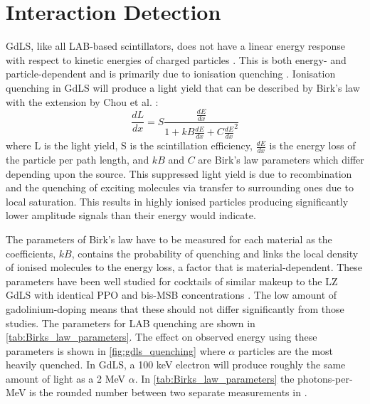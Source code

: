 \section{Interaction Detection}
\label{sec:od_physics}
\par
GdLS, like all LAB-based scintillators, does not have a linear energy response with respect to kinetic energies of charged particles \cite{nonlinear_gdls_ref}.
This is both energy- and particle-dependent and is primarily due to ionisation quenching \cite{lab_quenching_theory_ref}.
Ionisation quenching in GdLS will produce a light yield that can be described by Birk's law \cite{birks_law_ref} with the extension by Chou et al. \cite{generalised_birks_ref}:
\begin{equation} 
    \frac{dL}{dx} = S \frac{\frac{dE}{dx}}{1 + kB\frac{dE}{dx} + C\frac{dE}{dx}^2}
    \label{eq:birkslaw}
\end{equation}
where L is the light yield, S is the scintillation efficiency, $\frac{dE}{dx}$ is the energy loss of the particle per path length, and $kB$ and $C$ are Birk's law parameters which differ depending upon the source.
This suppressed light yield is due to recombination and the quenching of exciting molecules via transfer to surrounding ones due to local saturation.
This results in highly ionised particles producing significantly lower amplitude signals than their energy would indicate.

\par
The parameters of Birk's law have to be measured for each material as the coefficients, $kB$, contains the probability of quenching and links the local density of ionised molecules to the energy loss, a factor that is material-dependent. 
These parameters have been well studied for cocktails of similar makeup to the LZ GdLS with identical PPO and bis-MSB concentrations \cite{ls_alpha_quenching_ref,ls_proton_quenching_ref}.
The low amount of gadolinium-doping means that these should not differ significantly from those studies.
The parameters for LAB quenching are shown in \autoref{tab:Birks_law_parameters}.
The effect on observed energy using these parameters is shown in \autoref{fig:gdls_quenching} where $\alpha$ particles are the most heavily quenched.
In GdLS, a 100 keV electron will produce roughly the same amount of light as a 2 MeV $\alpha$.
In \autoref{tab:Birks_law_parameters} the photons-per-MeV is the rounded number between two separate measurements in \cite{scotthaselschwardt_thesis_ref}.

